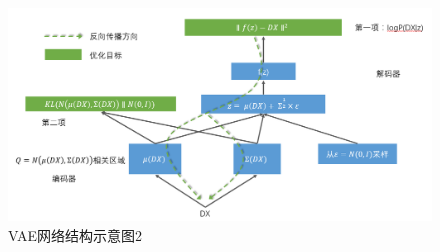             \begin{figure}[H]
            \centering
            \includegraphics[width=12cm]{images/VAE_net_structure2.jpg}
            \caption{VAE网络结构示意图2}
            \label{fig:VAE网络结构示意图2}
            \end{figure}

